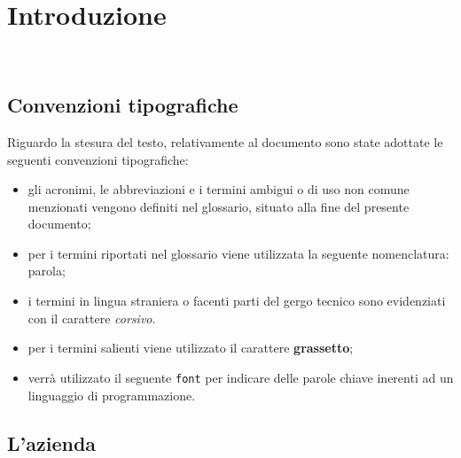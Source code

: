 \chapter{Introduzione}
\label{cap:introduzione}

\\





\section{Convenzioni tipografiche}
\label{sec:convenzioni-tipografiche}

Riguardo la stesura del testo, relativamente al documento sono state adottate le seguenti convenzioni tipografiche:
\begin{itemize}
	\item gli acronimi, le abbreviazioni e i termini ambigui o di uso non comune menzionati vengono definiti nel glossario, situato alla fine del presente documento;
	\item per i termini riportati nel glossario viene utilizzata la seguente nomenclatura: parola\glsoccur;
	\item i termini in lingua straniera o facenti parti del gergo tecnico sono evidenziati con il carattere \emph{corsivo}.
	\item per i termini salienti viene utilizzato il carattere \textbf{grassetto};
	\item verrà utilizzato il seguente \lstinline{font} per indicare delle parole chiave inerenti ad un linguaggio di programmazione.
\end{itemize}

\section{L'azienda}
\label{sec:azienda}

